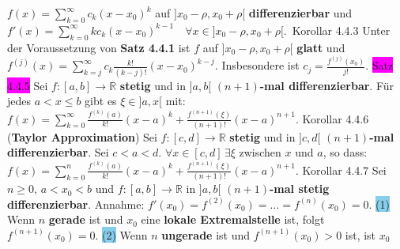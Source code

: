 \documentclass[landscape, 10pt]{article}
\newcommand{\R}{\mathbb{R}}
\begin{document}
\begin{multicols}{3}
                \textcolor{NavyBlue}{$f(x)=\sum_{k=0}^\infty c_k(x-x_0)^k$} 
         auf \textcolor{NavyBlue}{$]x_0-\rho,x_0+\rho[$} \textbf{differenzierbar} und 
                \textcolor{NavyBlue}{$f'(x)=\sum_{k=0}^\infty kc_k(x-x_0)^{k-1}\quad
                \forall x\in]x_0-\rho,x_0+\rho[$}.\
\colorbox{BurntOrange}{Korollar 4.4.3} Unter der Voraussetzung von \textbf{Satz 4.4.1} ist 
                \textcolor{NavyBlue}{$f$} auf \textcolor{NavyBlue}{$]x_0-\rho,x_0+\rho[$} 
                \textbf{glatt} und 
         \textcolor{NavyBlue}{
                $f^{(j)}(x)=\sum_{k=j}^\infty c_k\frac{k!}{(k-j)!}(x-x_0)^{k-j}$}. 
                Insbesondere ist \textcolor{NavyBlue}{$c_j=\frac{f^{(j)}(x_0)}{j!}$}.
\colorbox{magenta}{Satz 4.4.5} Sei \textcolor{NavyBlue}{$f:[a,b]\longrightarrow\R$}
                \textbf{stetig} und in 
                \textcolor{NavyBlue}{$]a,b[$} \textbf{$(n+1)$-mal differenzierbar}. 
                Für jedes \textcolor{NavyBlue}{$a<x\leqslant b$} gibt es 
         \textcolor{NavyBlue}{$\xi\in]a,x[$} mit: 
                \textcolor{NavyBlue}{$f(x)=\sum_{k=0}^\infty\frac{f^{(k)}(a)}{k!}(x-a)^k
                +\frac{f^{(n+1)}(\xi)}{(n+1)!}(x-a)^{n+1}$}. 
\colorbox{BurntOrange}{Korollar 4.4.6} (\textbf{Taylor Approximation}) Sei
                \textcolor{NavyBlue}{$f:[c,d]\longrightarrow\R$} \textbf{stetig} und in 
                \textcolor{NavyBlue}{$]c,d[$} \textbf{$(n+1)$-mal differenzierbar}. Sei 
         \textcolor{NavyBlue}{$c<a<d$}. 
                \textcolor{NavyBlue}{$\forall x\in[c,d]\,\exists\xi$} zwischen 
                \textcolor{NavyBlue}{$x$} und \textcolor{NavyBlue}{$a$}, so dass: 
                \textcolor{NavyBlue}{$f(x)=\sum_{k=0}^n\frac{f^{(k)}(a)}{k!}(x-a)^k
                +\frac{f^{(n+1)}(\xi)}{(n+1)!}(x-a)^{n+1}$}.
\colorbox{BurntOrange}{Korollar 4.4.7} Sei \textcolor{NavyBlue}{$n\geqslant0,\,a<x_0<b$} und 
                \textcolor{NavyBlue}{$f:[a,b]\longrightarrow\R$} 
                in \textcolor{NavyBlue}{$]a,b[$} \textbf{$(n+1)$-mal stetig differenzierbar}.
         Annahme: \textcolor{NavyBlue}{$f'(x_0)=f^{(2)}(x_0)=...=f^{(n)}(x_0)=0$}. 
         \colorbox{SkyBlue}{(1)} Wenn \textcolor{NavyBlue}{$n$} \textbf{gerade} 
                ist und \textcolor{NavyBlue}{$x_0$} eine 
                \textbf{lokale Extremalstelle} ist, folgt
                \textcolor{NavyBlue}{ $f^{(n+1)}(x_0)=0$}. 
         \colorbox{SkyBlue}{(2)} Wenn \textcolor{NavyBlue}{$n$} \textbf{ungerade}
                ist und 
                \textcolor{NavyBlue}{$f^{(n+1)}(x_0)>0$} ist, ist \textcolor{NavyBlue}{$x_0$} 

\end{multicols}
\end{document}
